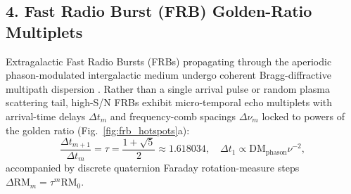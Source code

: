 \documentclass[aps,prd,twocolumn,superscriptaddress,nofootinbib]{revtex4-2}
\begin{document}
\subsection{4. Fast Radio Burst (FRB) Golden-Ratio Multiplets}
Extragalactic Fast Radio Bursts (FRBs) propagating through the aperiodic phason-modulated intergalactic medium undergo coherent Bragg-diffractive multipath dispersion \cite{Wigner1955,Smith1960}. Rather than a single arrival pulse or random plasma scattering tail, high-S/N FRBs exhibit micro-temporal echo multiplets with arrival-time delays $\Delta t_m$ and frequency-comb spacings $\Delta\nu_m$ locked to powers of the golden ratio (Fig.~\ref{fig:frb_hotspots}a):
\begin{equation}
\frac{\Delta t_{m+1}}{\Delta t_m} = \tau = \frac{1+\sqrt{5}}{2} \approx 1.618034, \quad \Delta t_1 \propto \mathrm{DM}_{\mathrm{phason}} \nu^{-2},
\end{equation}
accompanied by discrete quaternion Faraday rotation-measure steps $\Delta\mathrm{RM}_m = \tau^m \mathrm{RM}_0$.
\end{document}
